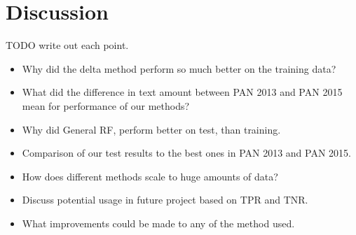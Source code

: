 \section{Discussion}
TODO write out each point.

\begin{itemize}
    \item Why did the delta method perform so much better on the training data?
    \item What did the difference in text amount between PAN 2013 and PAN 2015
        mean for performance of our methods?
    \item Why did General RF, perform better on test, than training.
    \item Comparison of our test results to the best ones in PAN 2013 and PAN
        2015.
    \item How does different methods scale to huge amounts of data?
    \item Discuss potential usage in future project based on TPR and TNR.
    \item What improvements could be made to any of the method used.
\end{itemize}
